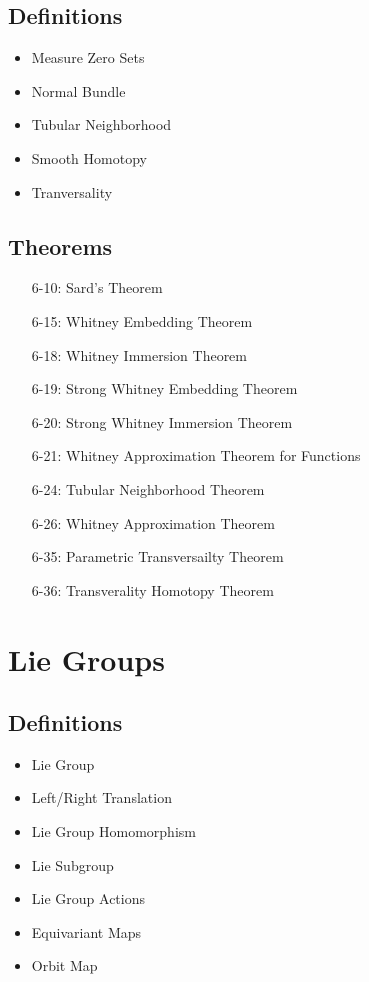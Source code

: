 \documentclass[11.5pt]{scrartcl}
\newcommand{\<}{\langle}
\renewcommand{\>}{\rangle}
\begin{document}
\subsection{Definitions}
\begin{itemize}
\item Measure Zero Sets
\item Normal Bundle
\item Tubular Neighborhood
\item Smooth Homotopy
\item Tranversality
\end{itemize}
\subsection{Theorems}
\begin{itemize}
\item[6-10:] Sard's Theorem
\item[6-15:] Whitney Embedding Theorem
\item[6-18:] Whitney Immersion Theorem
\item[6-19:] Strong Whitney Embedding Theorem
\item[6-20:] Strong Whitney Immersion Theorem
\item[6-21:] Whitney Approximation Theorem for Functions
\item[6-24:] Tubular Neighborhood Theorem
\item[6-26:] Whitney Approximation Theorem
\item[6-35:] Parametric Transversailty Theorem
\item[6-36:] Transverality Homotopy Theorem
\end{itemize}

\section{Lie Groups}
\subsection{Definitions}
\begin{itemize}
\item Lie Group
\item Left/Right Translation
\item Lie Group Homomorphism
\item Lie Subgroup
\item Lie Group Actions
\item Equivariant Maps
\item Orbit Map
\end{itemize}
\end{document}
